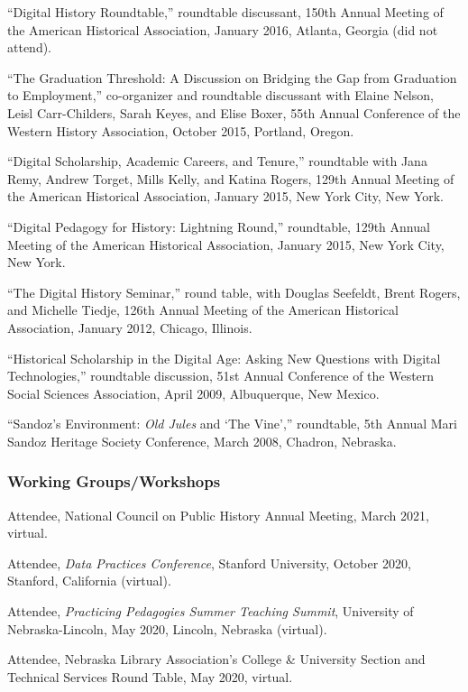 ``Digital History Roundtable,'' roundtable discussant, 150th Annual
Meeting of the American Historical Association, January 2016, Atlanta,
Georgia (did not attend).

``The Graduation Threshold: A Discussion on Bridging the Gap from
Graduation to Employment,'' co-organizer and roundtable discussant with
Elaine Nelson, Leisl Carr-Childers, Sarah Keyes, and Elise Boxer, 55th
Annual Conference of the Western History Association, October 2015,
Portland, Oregon.

``Digital Scholarship, Academic Careers, and Tenure,'' roundtable with
Jana Remy, Andrew Torget, Mills Kelly, and Katina Rogers, 129th Annual
Meeting of the American Historical Association, January 2015, New York
City, New York.

``Digital Pedagogy for History: Lightning Round,'' roundtable, 129th
Annual Meeting of the American Historical Association, January 2015, New
York City, New York.

``The Digital History Seminar,'' round table, with Douglas Seefeldt,
Brent Rogers, and Michelle Tiedje, 126th Annual Meeting of the American
Historical Association, January 2012, Chicago, Illinois.

``Historical Scholarship in the Digital Age: Asking New Questions with
Digital Technologies,'' roundtable discussion, 51st Annual Conference of
the Western Social Sciences Association, April 2009, Albuquerque, New
Mexico.

``Sandoz's Environment: \emph{Old Jules} and `The Vine','' roundtable,
5th Annual Mari Sandoz Heritage Society Conference, March 2008, Chadron,
Nebraska.

\subsubsection{Working Groups/Workshops}\label{working-groupsworkshops}

Attendee, National Council on Public History Annual Meeting, March 2021,
virtual.

Attendee, \emph{Data Practices Conference}, Stanford University, October
2020, Stanford, California (virtual).

Attendee, \emph{Practicing Pedagogies Summer Teaching Summit},
University of Nebraska-Lincoln, May 2020, Lincoln, Nebraska (virtual).

Attendee, Nebraska Library Association's College \& University Section
and Technical Services Round Table, May 2020, virtual.

